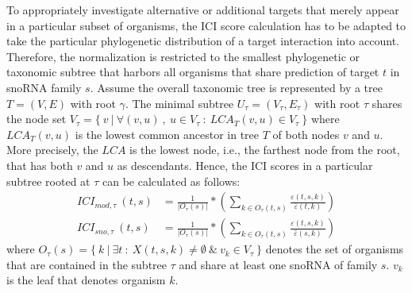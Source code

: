 \documentclass[preprint,3p,times,twocolumn]{elsarticle}
\newcommand{\TODO}[1] {\begingroup\color{red}#1\endgroup}
\newcommand{\snostrip}{\texttt{snoStrip}}
\newcommand{\sce}{\emph{S.cerevisiae}}
\begin{document}
To appropriately investigate alternative or additional targets that
merely appear in a particular subset of organisms, the ICI score
calculation has to be adapted to take the particular phylogenetic
distribution of a target interaction into account. Therefore, the
normalization is restricted to the smallest phylogenetic or taxonomic
subtree that harbors all organisms that share prediction of target
$t$ in snoRNA family $s$.  Assume the overall taxonomic tree is
represented by a tree $T=(V,E)$ with root $\gamma$. The minimal
subtree $U_\tau = (V_\tau, E_\tau)$ with root $\tau$ shares the node
set
$V_\tau = \{\ v\ |\ \forall (v,u)\ ,\ u \in V_\tau\ :\ LCA_T(v,u) \in
V_\tau\ \}$ where $LCA_T(v,u)$ is the lowest common ancestor in tree
$T$ of both nodes $v$ and $u$. More precisely, the $LCA$ is the lowest
node, i.e., the farthest node from the root, that has both $v$ and $u$
as descendants.  Hence, the ICI scores in a particular subtree rooted
at $\tau$ can be calculated as follows:
\begin{equation}
  \begin{split}
    ICI_{mod,\tau}\:(t,s) & = \frac{1}{|O_\tau(s)|} * \left( \sum_{k\in O_\tau(t,s)} \frac{\varepsilon(t,s,k)}{\bar\varepsilon(t,k)} \right)
    \\
    ICI_{sno,\tau}\:(t,s) & = \frac{1}{|O_\tau(s)|} * \left( \sum_{k\in O_\tau(t,s)} \frac{\varepsilon(t,s,k)}{\hat\varepsilon(s,k)} \right)
  \end{split}
\end{equation}
where
$O_\tau(s) = \{\ k\ |\ \exists t\ :\ X(t,s,k) \ne \emptyset\ \&\ v_k
\in V_\tau\ \}$ denotes the set of organisms that are contained in the
subtree $\tau$ and share at least one snoRNA of family $s$. $v_k$ is
the leaf that denotes organism $k$.


\end{document}
